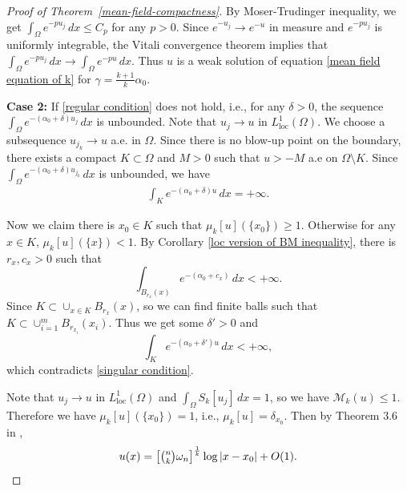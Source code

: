 \documentclass[11pt]{amsart}
\numberwithin{equation}{section}
\numberwithin{equation}{section}
\begin{document}
\begin{proof}[Proof of Theorem~\ref{mean-field-compactness}]
	By Moser-Trudinger inequality, we get $\int_\Omega e^{-pu_j}\,dx\le C_p$ for any $p>0$. 
	Since $e^{-u_j}\to e^{-u}$ in measure and $e^{-pu_j}$ is uniformly integrable, the Vitali convergence theorem implies that $\int_\Omega e^{-p u_j}\,dx\to \int_\Omega e^{-p u}\,dx$.
	Thus $u$ is a weak solution of equation \eqref{mean field equation of k}  for $\gamma=\frac{k+1}{k}\alpha_0$.
	
\medskip
\noindent\textbf{Case 2:}	If \eqref{regular condition} does not hold, i.e., for any
$\delta > 0$,  the sequence $\int_{\Omega}e^{-(\alpha_0+\delta)u_j}\,dx$ is unbounded. Note that $u_j\to u$ in $L^1_{\text{loc}}(\Omega)$. We choose a subsequence $u_{j_k}\to u$ a.e. in $\Omega$. Since there is no blow-up point on the boundary, there exists a compact $K \subset \Omega$ and $M>0$ such that $u>-M$ a.e on $\Omega\setminus K$.  Since $\int_{\Omega}e^{-(\alpha_0+\delta)u_{j_k}}\,dx$ is unbounded, we have	
	\begin{align}\label{singular condition}
		\int_{K}e^{-(\alpha_0+\delta)u}\,dx=+\infty.
	\end{align}
	
	Now we claim there is $x_0\in K$ such that $\mu_k[u](\{x_0\})\ge 1$.
	Otherwise for any $x\in K$, $\mu_k[u](\{x\})< 1$. By Corollary \ref{loc version of BM inequality}, there is $r_x, c_x>0$ such that 
	\[\int_{B_{r_x}(x)}e^{-(\alpha_0+c_x)}\,dx<+\infty.\] 
	Since $K\subset \cup_{x\in K}B_{r_x}(x)$, so we can find finite balls such that $K\subset \cup_{ i=1}^mB_{r_{x_i}}(x_i)$. Thus we get some $\delta'>0$ and 
	\[\int_{K}e^{-(\alpha_0+\delta')u}\,dx<+\infty,\] 
	which contradicts \eqref{singular condition}. 
	
	Note that $u_j\to u$ in $L^1_{\text{loc}}(\Omega)$ and $\int_{\Omega}S_k[u_j]\,dx=1$, so we have 
	$\mathcal M_k(u)\leq 1$. Therefore we have $\mu_k[u](\{x_0\})=1$, i.e., $\mu_k[u]=\delta_{x_0}$. Then by Theorem 3.6 in \cite{Lab02},
	\[u(x)=\left[\tbinom{n}{k}\omega_n\right]^{\frac{1}{k}}\log|x-x_0|+O(1).\]
\end{proof}
\end{document}
